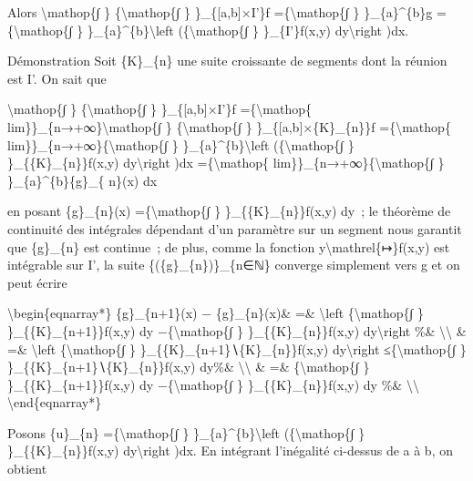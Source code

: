 \documentclass[]{article}
\begin{document}
Alors \textbackslash{}mathop\{∫ \} \{\textbackslash{}mathop\{∫ \}
\}\_\{{[}a,b{]}×I'\}f =\{\textbackslash{}mathop\{∫ \}
\}\_\{a\}\^{}\{b\}g =\{\textbackslash{}mathop\{∫ \}
\}\_\{a\}\^{}\{b\}\textbackslash{}left (\{\textbackslash{}mathop\{∫ \}
\}\_\{I'\}f(x,y) dy\textbackslash{}right )dx.

Démonstration Soit \{K\}\_\{n\} une suite croissante de segments dont la
réunion est I'. On sait que

\textbackslash{}mathop\{∫ \} \{\textbackslash{}mathop\{∫ \}
\}\_\{{[}a,b{]}×I'\}f =\{\textbackslash{}mathop\{
lim\}\}\_\{n→+∞\}\textbackslash{}mathop\{∫ \}
\{\textbackslash{}mathop\{∫ \} \}\_\{{[}a,b{]}×\{K\}\_\{n\}\}f
=\{\textbackslash{}mathop\{ lim\}\}\_\{n→+∞\}\{\textbackslash{}mathop\{∫
\} \}\_\{a\}\^{}\{b\}\textbackslash{}left (\{\textbackslash{}mathop\{∫
\} \}\_\{\{K\}\_\{n\}\}f(x,y) dy\textbackslash{}right )dx
=\{\textbackslash{}mathop\{ lim\}\}\_\{n→+∞\}\{\textbackslash{}mathop\{∫
\} \}\_\{a\}\^{}\{b\}\{g\}\_\{ n\}(x) dx

en posant \{g\}\_\{n\}(x) =\{\textbackslash{}mathop\{∫ \}
\}\_\{\{K\}\_\{n\}\}f(x,y) dy~; le théorème de continuité des intégrales
dépendant d'un paramètre sur un segment nous garantit que \{g\}\_\{n\}
est continue~; de plus, comme la fonction
y\textbackslash{}mathrel\{↦\}f(x,y) est intégrable sur I', la suite
\{(\{g\}\_\{n\})\}\_\{n∈ℕ\} converge simplement vers g et on peut écrire

\textbackslash{}begin\{eqnarray*\} \textbar{}\{g\}\_\{n+1\}(x) −
\{g\}\_\{n\}(x)\textbar{}\& =\& \textbackslash{}left
\textbar{}\{\textbackslash{}mathop\{∫ \} \}\_\{\{K\}\_\{n+1\}\}f(x,y) dy
−\{\textbackslash{}mathop\{∫ \} \}\_\{\{K\}\_\{n\}\}f(x,y)
dy\textbackslash{}right \textbar{} \%\& \textbackslash{}\textbackslash{}
\& =\& \textbackslash{}left \textbar{}\{\textbackslash{}mathop\{∫ \}
\}\_\{\{K\}\_\{n+1\}∖\{K\}\_\{n\}\}f(x,y) dy\textbackslash{}right
\textbar{} ≤\{\textbackslash{}mathop\{∫ \}
\}\_\{\{K\}\_\{n+1\}∖\{K\}\_\{n\}\}\textbar{}f(x,y)\textbar{} dy\%\&
\textbackslash{}\textbackslash{} \& =\& \{\textbackslash{}mathop\{∫ \}
\}\_\{\{K\}\_\{n+1\}\}\textbar{}f(x,y)\textbar{} dy
−\{\textbackslash{}mathop\{∫ \}
\}\_\{\{K\}\_\{n\}\}\textbar{}f(x,y)\textbar{} dy \%\&
\textbackslash{}\textbackslash{} \textbackslash{}end\{eqnarray*\}

Posons \{u\}\_\{n\} =\{\textbackslash{}mathop\{∫ \}
\}\_\{a\}\^{}\{b\}\textbackslash{}left (\{\textbackslash{}mathop\{∫ \}
\}\_\{\{K\}\_\{n\}\}\textbar{}f(x,y)\textbar{} dy\textbackslash{}right
)dx. En intégrant l'inégalité ci-dessus de a à b, on obtient
\end{document}
